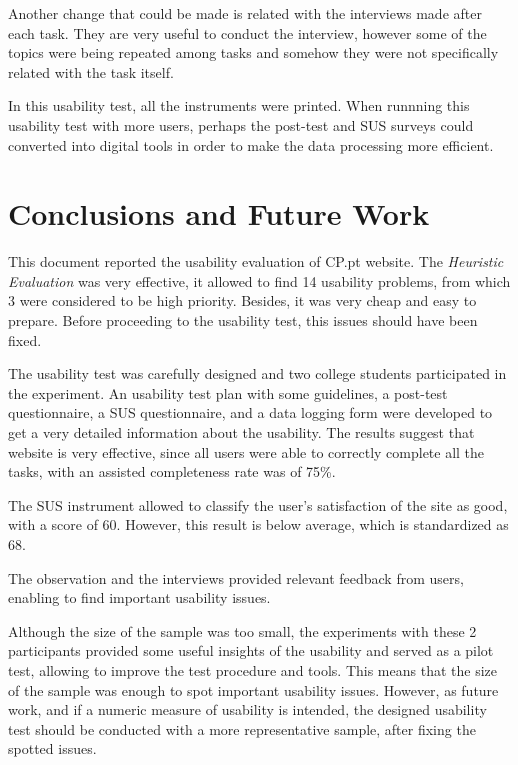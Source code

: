\documentclass[a4paper]{article}
\begin{document}
Another change that could be made is related with the interviews made after each task. They are very useful to conduct the interview, however some of the topics were being repeated among tasks and somehow they were not specifically related with the task itself.

In this usability test, all the instruments were printed. When runnning this usability test with more users, perhaps the post-test and SUS surveys could converted into digital tools in order to make the data processing more efficient.




\section{Conclusions and Future Work}

This document reported the usability evaluation of CP.pt website. The \emph{Heuristic Evaluation} was very effective, it allowed to find 14 usability problems, from which 3 were considered to be high priority. Besides, it was very cheap and easy to prepare. Before proceeding to the usability test, this issues should have been fixed.

The usability test was carefully designed and two college students participated in the experiment.
An usability test plan with some guidelines, a post-test questionnaire, a SUS questionnaire, and a data logging form were developed to get a very detailed information about the usability.
The results suggest that website is very effective, since all users were able to correctly complete all the tasks, with an assisted completeness rate was of 75\%. 

The SUS instrument allowed to classify the user's satisfaction of the site as good, with a score of 60. However, this result is below average, which is standardized as 68.

The observation and the interviews provided relevant feedback from  users, enabling to find important usability issues.

Although the size of the sample was too small, the experiments with these 2 participants provided some useful insights of the usability and served as a pilot test, allowing to improve the test procedure and tools. This means that the size of the sample was enough to spot important usability issues. However, as future work, and if a numeric measure of usability is intended, the designed usability test should be conducted with a more representative sample, after fixing the spotted issues.
\end{document}
